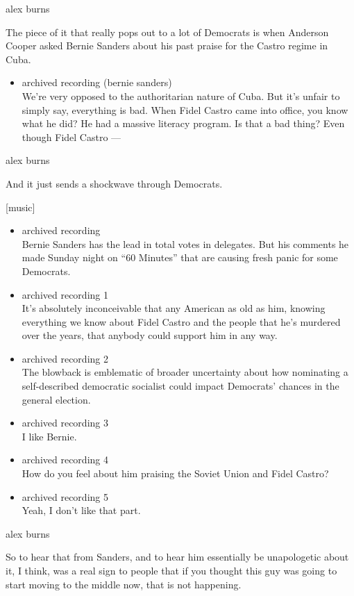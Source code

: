 alex burns

The piece of it that really pops out to a lot of Democrats is when
Anderson Cooper asked Bernie Sanders about his past praise for the
Castro regime in Cuba.

\begin{itemize}
\tightlist
\item
  archived recording (bernie sanders)\\
  We're very opposed to the authoritarian nature of Cuba. But it's
  unfair to simply say, everything is bad. When Fidel Castro came into
  office, you know what he did? He had a massive literacy program. Is
  that a bad thing? Even though Fidel Castro ---
\end{itemize}

alex burns

And it just sends a shockwave through Democrats.

{[}music{]}

\begin{itemize}
\item
  archived recording\\
  Bernie Sanders has the lead in total votes in delegates. But his
  comments he made Sunday night on ``60 Minutes'' that are causing fresh
  panic for some Democrats.
\item
  archived recording 1\\
  It's absolutely inconceivable that any American as old as him, knowing
  everything we know about Fidel Castro and the people that he's
  murdered over the years, that anybody could support him in any way.
\item
  archived recording 2\\
  The blowback is emblematic of broader uncertainty about how nominating
  a self-described democratic socialist could impact Democrats' chances
  in the general election.
\item
  archived recording 3\\
  I like Bernie.
\item
  archived recording 4\\
  How do you feel about him praising the Soviet Union and Fidel Castro?
\item
  archived recording 5\\
  Yeah, I don't like that part.
\end{itemize}

alex burns

So to hear that from Sanders, and to hear him essentially be
unapologetic about it, I think, was a real sign to people that if you
thought this guy was going to start moving to the middle now, that is
not happening.


